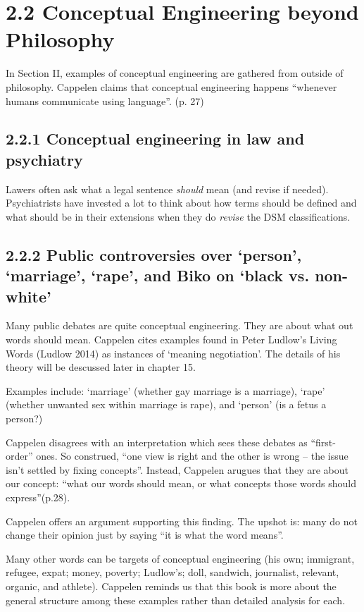 \documentclass[
10pt, %
a4paper, %
twocolumn, %
landscape %
]{article}
\begin{document}
\section*{2.2 Conceptual Engineering beyond Philosophy}
In Section II, examples of conceptual engineering are gathered from outside of philosophy.
Cappelen claims that conceptual  engineering happens ``whenever humans communicate using language''. (p. 27)

\subsection*{2.2.1 Conceptual engineering in law and psychiatry}
Lawers often ask what a legal sentence \emph{should} mean (and revise if needed). Psychiatrists have invested a lot to think about how terms should be defined and what should be in their extensions when they do \emph{revise} the DSM classifications.
\subsection*{2.2.2 Public controversies over `person', `marriage', `rape', and Biko on `black vs. non-white'}
Many public debates are quite conceptual engineering. They are about what out words should mean.
Cappelen cites examples found in Peter Ludlow's Living Words (Ludlow 2014) as instances of `meaning negotiation'.
The details of his theory will be descussed later in chapter 15.

Examples include:
`marriage' (whether gay marriage is a marriage), `rape' (whether unwanted sex within marriage is rape), and `person' (is a fetus a person?)

Cappelen disagrees with an interpretation which sees these debates as ``first-order'' ones. So construed, ``one view is right and the other is wrong -- the issue isn't settled by fixing concepts''.
Instead, Cappelen arugues that they are about our concept: ``what our words should mean, or what concepts those words should express''(p.28).

Cappelen offers an argument supporting this finding. The upshot is: many do not change their opinion just by saying ``it is what the word means''.

Many other words can be targets of conceptual engineering (his own; immigrant, refugee, expat; money, poverty; Ludlow's; doll, sandwich, journalist, relevant, organic, and athlete).
Cappelen reminds us that this book is more about  the general structure among these examples rather than detailed analysis for each.
\end{document}

